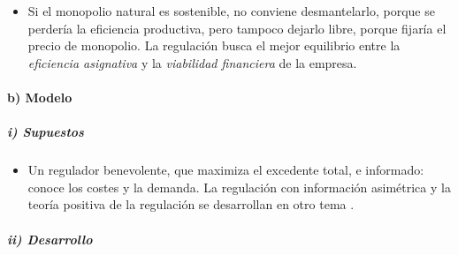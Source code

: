 \documentclass[11pt]{article}
\begin{document}
\begin{itemize}
\item Si el monopolio natural es sostenible, no conviene desmantelarlo, porque se perdería la eficiencia productiva, pero tampoco dejarlo libre, porque fijaría el precio de monopolio. La regulación busca el mejor equilibrio entre la \emph{eficiencia asignativa} y la \emph{viabilidad financiera} de la empresa.
\end{itemize}

\paragraph{b) Modelo}

\subparagraph{i) Supuestos}

\begin{itemize}
\item Un regulador benevolente, que maximiza el excedente total, e informado: conoce los costes y la demanda. La regulación con información asimétrica y la teoría positiva de la regulación se desarrollan en otro tema .
\end{itemize}

\subparagraph{ii) Desarrollo}
\end{document}
